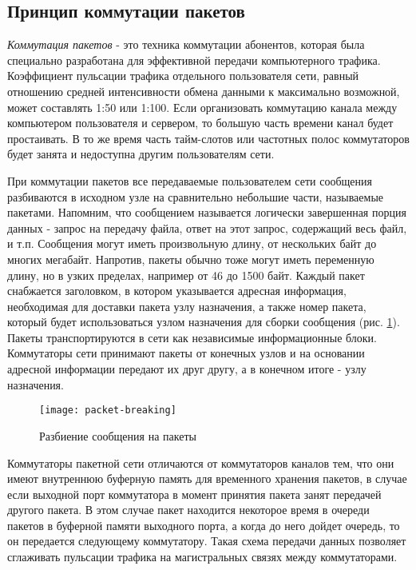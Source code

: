 \subsection{Принцип коммутации пакетов}

\emph{Коммутация пакетов} - это техника коммутации абонентов, которая была специально разработана для эффективной передачи компьютерного трафика.
Коэффициент пульсации трафика отдельного пользователя сети, равный отношению средней интенсивности обмена данными к максимально возможной, может составлять 1:50 или 1:100.
Если организовать коммутацию канала между компьютером пользователя и сервером, то большую часть времени канал будет простаивать.
В то же время часть тайм-слотов или частотных полос коммутаторов будет занята и недоступна другим пользователям сети.

При коммутации пакетов все передаваемые пользователем сети сообщения разбиваются в исходном узле на сравнительно небольшие части, называемые пакетами.
Напомним, что сообщением называется логически завершенная порция данных - запрос на передачу файла, ответ на этот запрос, содержащий весь файл, и т.п.
Сообщения могут иметь произвольную длину, от нескольких байт до многих мегабайт.
Напротив, пакеты обычно тоже могут иметь переменную длину, но в узких пределах, например от 46 до 1500 байт.
Каждый пакет снабжается заголовком, в котором указывается адресная информация, необходимая для доставки пакета узлу назначения, а также номер пакета, который будет использоваться узлом назначения для сборки сообщения (рис. \ref{fig:packet-breaking}).
Пакеты транспортируются в сети как независимые информационные блоки.
Коммутаторы сети принимают пакеты от конечных узлов и на основании адресной информации передают их друг другу, а в конечном итоге - узлу назначения.

\begin{figure}
    \centering
    \texttt{[image: packet-breaking]}
    \caption{Разбиение сообщения на пакеты}
    \label{fig:packet-breaking}
\end{figure}

Коммутаторы пакетной сети отличаются от коммутаторов каналов тем, что они имеют внутреннюю буферную память для временного хранения пакетов, в случае если выходной порт коммутатора в момент принятия пакета занят передачей другого пакета.
В этом случае пакет находится некоторое время в очереди пакетов в буферной памяти выходного порта, а когда до него дойдет очередь, то он передается следующему коммутатору.
Такая схема передачи данных позволяет сглаживать пульсации трафика на магистральных связях между коммутаторами.

